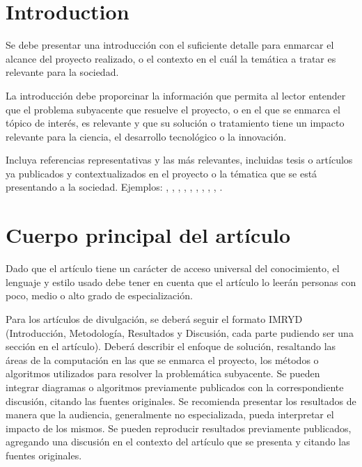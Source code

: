 \documentclass[sigconf]{acmart}
\begin{document}

\maketitle

\section{Introduction}
Se debe presentar una introducción con el suficiente detalle para enmarcar el alcance del proyecto realizado, o el contexto en el cuál la temática a tratar es relevante para la sociedad. 

La introducción debe proporcinar la información que permita al lector entender que el problema subyacente que resuelve el proyecto, o en el que se enmarca el tópico de interés, es relevante y que su solución o tratamiento tiene un impacto relevante para la ciencia, el desarrollo tecnológico o la innovación.

Incluya referencias representativas y las más relevantes, incluidas tesis o artículos ya publicados y contextualizados en el proyecto o la tématica que se está presentando a la sociedad. Ejemplos: \cite{Smith10}, \cite{VanGundy07}, \cite{Harel78}, \cite{Bornmann2019,AnzarootPBM14}, \cite{Clarkson85}, \cite{anisi03}, \cite{Thornburg01, Ablamowicz07, Poker06}, \cite{Obama08}, \cite{Novak03}, \cite{Lee05}.

\section{Cuerpo principal del artículo}

Dado que el artículo tiene un carácter de acceso universal del conocimiento, el lenguaje y estilo usado debe tener en cuenta que el artículo lo leerán personas con poco, medio o alto grado de especialización. 

Para los artículos de divulgación, se deberá seguir el formato IMRYD (Introducción, Metodología, Resultados y Discusión, cada parte pudiendo ser una sección en el artículo). Deberá describir el enfoque de solución, resaltando las áreas de la computación en las que se enmarca el proyecto, los métodos o algoritmos utilizados para resolver la problemática subyacente. Se pueden integrar diagramas o algoritmos previamente publicados con la correspondiente discusión, citando las fuentes originales.
Se recomienda presentar los resultados de manera que la audiencia, generalmente no especializada, pueda interpretar el impacto de los mismos. Se pueden reproducir resultados previamente publicados, agregando una discusión en el contexto del artículo que se presenta y citando las fuentes originales.
\end{document}
